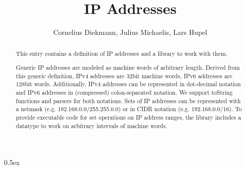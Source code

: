 \documentclass[11pt,a4paper]{article}
\begin{document}
\title{IP Addresses}
\author{Cornelius Diekmann, Julius Michaelis, Lars Hupel}
\maketitle

\begin{abstract}  
  This entry contains a definition of IP addresses and a library to work with them. 
  
  Generic IP addresses are modeled as machine words of arbitrary length. 
  Derived from this generic definition, IPv4 addresses are 32bit machine words, IPv6 addresses are 128bit words. 
  Additionally, IPv4 addresses can be represented in dot-decimal notation and IPv6 addresses in (compressed) colon-separated notation. 
  We support toString functions and parsers for both notations. 
  Sets of IP addresses can be represented with a netmask (e.g. 192.168.0.0/255.255.0.0) or in CIDR notation (e.g. 192.168.0.0/16). 
  To provide executable code for set operations on IP address ranges, the library includes a datatype to work on arbitrary intervals of machine words. 
\end{abstract}

\tableofcontents

\parindent 0pt\parskip 0.5ex



%
%
\end{document}
